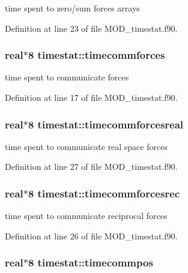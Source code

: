 time spent to zero/sum forces arrays 



Definition at line 23 of file M\-O\-D\-\_\-timestat.\-f90.

\hypertarget{classtimestat_a399092aecbb684c6c75d4cf3a229b338}{
\subsubsection[{timecommforces}]{\setlength{\rightskip}{0pt plus 5cm}real$\ast$8 timestat\-::timecommforces}}\label{classtimestat_a399092aecbb684c6c75d4cf3a229b338}


time spent to communicate forces 



Definition at line 17 of file M\-O\-D\-\_\-timestat.\-f90.

\hypertarget{classtimestat_a8d3910d1238b8bb3013c0e392c4ecea0}{
\subsubsection[{timecommforcesreal}]{\setlength{\rightskip}{0pt plus 5cm}real$\ast$8 timestat\-::timecommforcesreal}}\label{classtimestat_a8d3910d1238b8bb3013c0e392c4ecea0}


time spent to communicate real space forces 



Definition at line 27 of file M\-O\-D\-\_\-timestat.\-f90.

\hypertarget{classtimestat_a07c1ac80b0d1f0ca25e058e1cf36b33e}{
\subsubsection[{timecommforcesrec}]{\setlength{\rightskip}{0pt plus 5cm}real$\ast$8 timestat\-::timecommforcesrec}}\label{classtimestat_a07c1ac80b0d1f0ca25e058e1cf36b33e}


time spent to communicate reciprocal forces 



Definition at line 26 of file M\-O\-D\-\_\-timestat.\-f90.

\hypertarget{classtimestat_adeaa27d83c5a9ed923fd9ad2332e1036}{
\subsubsection[{timecommpos}]{\setlength{\rightskip}{0pt plus 5cm}real$\ast$8 timestat\-::timecommpos}}\label{classtimestat_adeaa27d83c5a9ed923fd9ad2332e1036}


